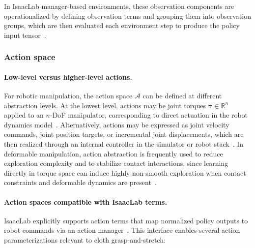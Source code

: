 In IsaacLab manager-based environments, these observation components are operationalized by defining observation terms and grouping them into observation groups, which are then evaluated each environment step to produce the policy input tensor~\cite{isaaclab_mdp_terms_api,isaaclab_managers_api}.

\subsubsection{Action space}

\paragraph{Low-level versus higher-level actions.}
For robotic manipulation, the action space $\mathcal{A}$ can be defined at different abstraction levels. At the lowest level, actions may be joint torques $\boldsymbol{\tau} \in \mathbb{R}^{n}$ applied to an $n$-\ac{DoF} manipulator, corresponding to direct actuation in the robot dynamics model~\cite{Siciliano2009Robotics}. Alternatively, actions may be expressed as joint velocity commands, joint position targets, or incremental joint displacements, which are then realized through an internal controller in the simulator or robot stack~\cite{Siciliano2009Robotics}. In deformable manipulation, action abstraction is frequently used to reduce exploration complexity and to stabilize contact interactions, since learning directly in torque space can induce highly non-smooth exploration when contact constraints and deformable dynamics are present~\cite{Kadi2023ClothLikeReview}. %

\paragraph{Action spaces compatible with IsaacLab terms.}
IsaacLab explicitly supports action terms that map normalized policy outputs to robot commands via an action manager~\cite{isaaclab_mdp_terms_api,isaaclab_managers_api}. This interface enables several action parameterizations relevant to cloth grasp-and-stretch:

